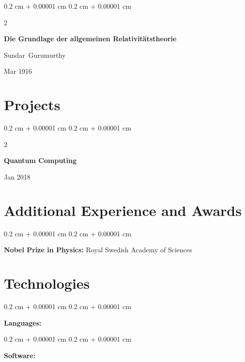 \documentclass[10pt, letterpaper]{article}
\newenvironment{onecolentry}{
    \begin{adjustwidth}{
        0.2 cm + 0.00001 cm
    }{
        0.2 cm + 0.00001 cm
    }
}{
    \end{adjustwidth}
} %
\newenvironment{twocolentry}[2][]{
    \onecolentry
    \def\secondColumn{#2}
    \setcolumnwidth{\fill, 4.5 cm}
    \begin{paracol}{2}
}{
    \switchcolumn \raggedleft \secondColumn
    \end{paracol}
    \endonecolentry
} %
\begin{document}
        \vspace{0.2 cm}

        \begin{samepage}
            \begin{twocolentry}{
                Mar 1916
            }
                \textbf{Die Grundlage der allgemeinen Relativitätstheorie}

                \vspace{0.10 cm}

                \mbox{Sundar Gurumurthy}
            \end{twocolentry}
        \end{samepage}


    
    \section{Projects}



        
        \begin{twocolentry}{
            Jan 2018
        }
            \textbf{Quantum Computing}
        \end{twocolentry}



    
    \section{Additional Experience and Awards}



        
        \begin{onecolentry}
            \textbf{Nobel Prize in Physics:} Royal Swedish Academy of Sciences
        \end{onecolentry}


    
    \section{Technologies}



        
        \begin{onecolentry}
            \textbf{Languages:} 
        \end{onecolentry}

        \vspace{0.2 cm}

        \begin{onecolentry}
            \textbf{Software:} 
        \end{onecolentry}


    
\end{document}

